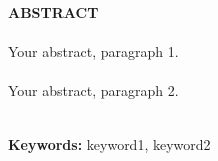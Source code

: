 \begin{center}
\thispagestyle{empty}
\vspace{2cm}
\LARGE{\textbf{ABSTRACT}}\\[1.0cm]
\end{center}
\thispagestyle{empty}
\large{\paragraph{}Your abstract, paragraph 1.}
\large{\paragraph{}Your abstract, paragraph 2.}\\
\textbf{Keywords: }keyword1, keyword2